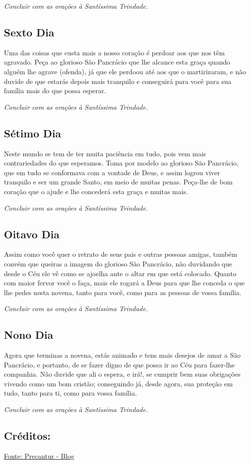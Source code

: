 \documentclass[18pt]{article}
\begin{document}
\textit{Concluir com as orações à Santíssima Trindade.}

\subsection*{Sexto Dia}
Uma das coisas que custa mais a nosso coração é perdoar aos que nos têm agravado. Peça ao glorioso São Pancrácio que lhe alcance esta graça quando alguém lhe agrave (ofenda), já que ele perdoou até aos que o martirizaram, e não duvide de que estarás depois mais tranquilo e conseguirá para você para sua família mais do que possa esperar.

\textit{Concluir com as orações à Santíssima Trindade.}

\subsection*{Sétimo Dia}
Neste mundo se tem de ter muita paciência em tudo, pois vem mais contrariedades do que esperamos. Toma por modelo ao glorioso São Pancrácio, que em tudo se conformava com a vontade de Deus, e assim logrou viver tranquilo e ser um grande Santo, em meio de muitas penas. Peça-lhe de bom coração que o ajude e lhe concederá esta graça e muitas mais.

\textit{Concluir com as orações à Santíssima Trindade.}

\subsection*{Oitavo Dia}
Assim como você quer o retrato de seus pais e outras pessoas amigas, também convém que queiras a imagem do glorioso São Pancrácio, não duvidando que desde o Céu ele vê como se ajoelha ante o altar em que está colocado. Quanto com maior fervor você o faça, mais ele rogará a Deus para que lhe conceda o que lhe pedes nesta novena, tanto para você, como para as pessoas de vossa família.

\textit{Concluir com as orações à Santíssima Trindade.}

\subsection*{Nono Dia}
Agora que terminas a novena, estás animado e tens mais desejos de amar a São Pancrácio, e portanto, de se fazer digno de que possa ir ao Céu para fazer-lhe companhia. Não duvide que ali o espera, e irá!, se cumprir bem suas obrigações vivendo como um bom cristão; conseguindo já, desde agora, sua proteção em tudo, tanto para ti, como para vossa família.

\textit{Concluir com as orações à Santíssima Trindade.}

\vfill

\subsection*{Créditos:}

\href{https://precantur.blogspot.com/2015/05/novena-sao-pancracio.html}{Fonte: Precantur - Blog}
\end{document}
